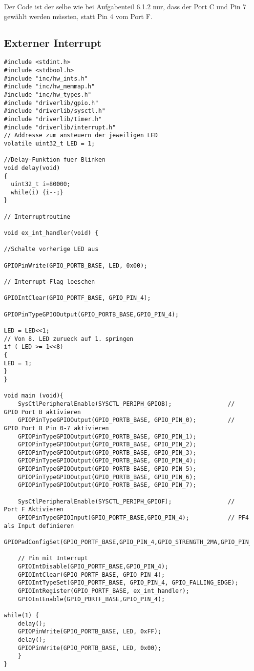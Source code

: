 \subsubsection{}
Der Code ist der selbe wie bei Aufgabenteil 6.1.2 nur, dass der Port C und Pin 7 gewählt werden müssten, statt Pin 4 vom Port F. 
 
\subsection{Externer Interrupt}
\begin{lstlisting}
#include <stdint.h>
#include <stdbool.h>
#include "inc/hw_ints.h"
#include "inc/hw_memmap.h"
#include "inc/hw_types.h"
#include "driverlib/gpio.h"
#include "driverlib/sysctl.h"
#include "driverlib/timer.h"
#include "driverlib/interrupt.h"
// Addresse zum ansteuern der jeweiligen LED
volatile uint32_t LED = 1;

//Delay-Funktion fuer Blinken
void delay(void)
{
  uint32_t i=80000;
  while(i) {i--;}
}

// Interruptroutine

void ex_int_handler(void) {

//Schalte vorherige LED aus

GPIOPinWrite(GPIO_PORTB_BASE, LED, 0x00);

// Interrupt-Flag loeschen

GPIOIntClear(GPIO_PORTF_BASE, GPIO_PIN_4);

GPIOPinTypeGPIOOutput(GPIO_PORTB_BASE,GPIO_PIN_4);

LED = LED<<1;
// Von 8. LED zurueck auf 1. springen
if ( LED >= 1<<8)
{
LED = 1;
}
}

void main (void){
    SysCtlPeripheralEnable(SYSCTL_PERIPH_GPIOB);                // GPIO Port B aktivieren
    GPIOPinTypeGPIOOutput(GPIO_PORTB_BASE, GPIO_PIN_0);         // GPIO Port B Pin 0-7 aktivieren
    GPIOPinTypeGPIOOutput(GPIO_PORTB_BASE, GPIO_PIN_1);
    GPIOPinTypeGPIOOutput(GPIO_PORTB_BASE, GPIO_PIN_2);
    GPIOPinTypeGPIOOutput(GPIO_PORTB_BASE, GPIO_PIN_3);
    GPIOPinTypeGPIOOutput(GPIO_PORTB_BASE, GPIO_PIN_4);
    GPIOPinTypeGPIOOutput(GPIO_PORTB_BASE, GPIO_PIN_5);
    GPIOPinTypeGPIOOutput(GPIO_PORTB_BASE, GPIO_PIN_6);
    GPIOPinTypeGPIOOutput(GPIO_PORTB_BASE, GPIO_PIN_7);

    SysCtlPeripheralEnable(SYSCTL_PERIPH_GPIOF);                // Port F Aktivieren
    GPIOPinTypeGPIOInput(GPIO_PORTF_BASE,GPIO_PIN_4);           // PF4 als Input definieren
    GPIOPadConfigSet(GPIO_PORTF_BASE,GPIO_PIN_4,GPIO_STRENGTH_2MA,GPIO_PIN_TYPE_STD_WPU);

    // Pin mit Interrupt
    GPIOIntDisable(GPIO_PORTF_BASE,GPIO_PIN_4);
    GPIOIntClear(GPIO_PORTF_BASE, GPIO_PIN_4);
    GPIOIntTypeSet(GPIO_PORTF_BASE, GPIO_PIN_4, GPIO_FALLING_EDGE);
    GPIOIntRegister(GPIO_PORTF_BASE, ex_int_handler);
    GPIOIntEnable(GPIO_PORTF_BASE,GPIO_PIN_4);

while(1) {
    delay();
    GPIOPinWrite(GPIO_PORTB_BASE, LED, 0xFF);
    delay();
    GPIOPinWrite(GPIO_PORTB_BASE, LED, 0x00);
	}
}
\end{lstlisting}